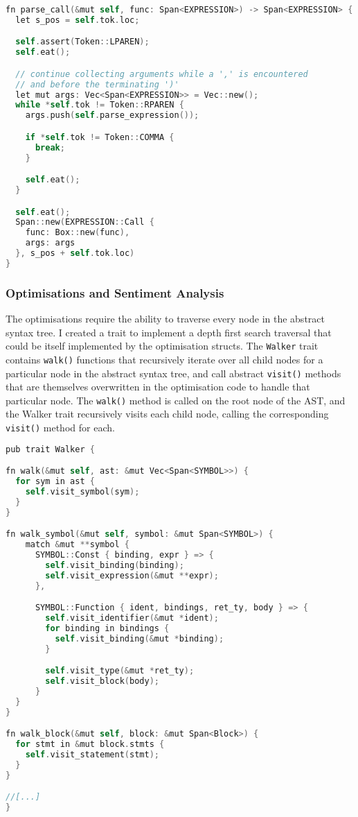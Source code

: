 \begin{lstlisting}[language=C]
fn parse_call(&mut self, func: Span<EXPRESSION>) -> Span<EXPRESSION> {
  let s_pos = self.tok.loc;

  self.assert(Token::LPAREN);
  self.eat();

  // continue collecting arguments while a ',' is encountered 
  // and before the terminating ')' 
  let mut args: Vec<Span<EXPRESSION>> = Vec::new();
  while *self.tok != Token::RPAREN {
    args.push(self.parse_expression());

    if *self.tok != Token::COMMA {
      break;
    }

    self.eat();
  }

  self.eat();
  Span::new(EXPRESSION::Call { 
    func: Box::new(func), 
    args: args 
  }, s_pos + self.tok.loc)
}
\end{lstlisting}

\subsubsection{Optimisations and Sentiment Analysis}
The optimisations require the ability to traverse every node in the abstract syntax tree. I created a trait to implement a depth first search traversal that could be itself implemented by the optimisation structs. The \texttt{Walker} trait contains \texttt{walk()} functions that recursively iterate over all child nodes for a particular node in the abstract syntax tree, and call abstract \texttt{visit()} methods that are themselves overwritten in the optimisation code to handle that particular node. The \texttt{walk()} method is called on the root node of the AST, and the Walker trait recursively visits each child node, calling the corresponding \texttt{visit()} method for each. 

\begin{lstlisting}[language=C]
pub trait Walker {

fn walk(&mut self, ast: &mut Vec<Span<SYMBOL>>) {
  for sym in ast {
    self.visit_symbol(sym);
  }
}

fn walk_symbol(&mut self, symbol: &mut Span<SYMBOL>) {
    match &mut **symbol {
      SYMBOL::Const { binding, expr } => {
        self.visit_binding(binding);
        self.visit_expression(&mut **expr);
      }, 

      SYMBOL::Function { ident, bindings, ret_ty, body } => {
        self.visit_identifier(&mut *ident);
        for binding in bindings {
          self.visit_binding(&mut *binding);
        }

        self.visit_type(&mut *ret_ty);
        self.visit_block(body);
      }
  } 
}

fn walk_block(&mut self, block: &mut Span<Block>) {
  for stmt in &mut block.stmts {
    self.visit_statement(stmt);
  }
}

//[...]
}
\end{lstlisting}

